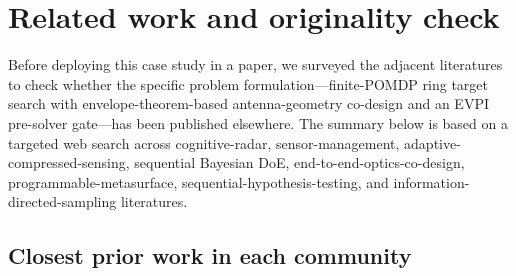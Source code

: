 \documentclass[11pt,a4paper]{article}
\begin{document}
\section{Related work and originality check}
\label{sec:related}

Before deploying this case study in a paper, we surveyed the adjacent literatures to check whether the specific problem formulation---finite-POMDP ring target search with envelope-theorem-based antenna-geometry co-design and an EVPI pre-solver gate---has been published elsewhere.  The summary below is based on a targeted web search across cognitive-radar, sensor-management, adaptive-compressed-sensing, sequential Bayesian DoE, end-to-end-optics-co-design, programmable-metasurface, sequential-hypothesis-testing, and information-directed-sampling literatures.

\subsection{Closest prior work in each community}
\end{document}
